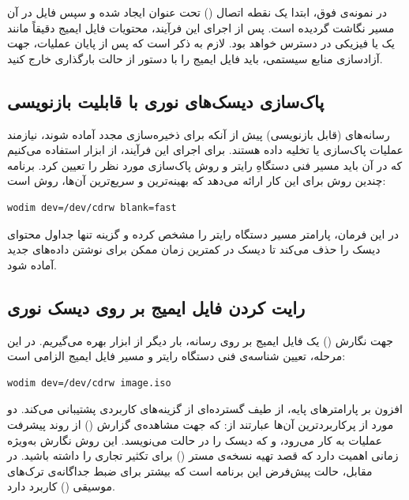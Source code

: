 در نمونه‌ی فوق، ابتدا یک نقطه اتصال () تحت عنوان  ایجاد شده و سپس فایل  در آن مسیر نگاشت گردیده است. پس از اجرای این فرآیند، محتویات فایل ایمیج دقیقاً مانند یک  یا  فیزیکی در دسترس خواهد بود. لازم به ذکر است که پس از پایان عملیات، جهت آزادسازی منابع سیستمی، باید فایل ایمیج را با دستور  از حالت بارگذاری خارج کنید.

\subsection{پاک‌سازی دیسک‌های نوری با قابلیت بازنویسی}

رسانه‌های  (قابل بازنویسی) پیش از آنکه برای ذخیره‌سازی مجدد آماده شوند، نیازمند عملیات پاک‌سازی یا تخلیه داده هستند. برای اجرای این فرآیند، از ابزار  استفاده می‌کنیم که در آن باید مسیر فنی دستگاهِ رایتر و روش پاک‌سازی مورد نظر را تعیین کرد. برنامه  چندین روش برای این کار ارائه می‌دهد که بهینه‌ترین و سریع‌ترین آن‌ها، روش  است:

\begin{latin}
\begin{lstlisting}
wodim dev=/dev/cdrw blank=fast
\end{lstlisting}
\end{latin}

در این فرمان، پارامتر  مسیر دستگاه رایتر را مشخص کرده و گزینه  تنها جداول محتوای دیسک را حذف می‌کند تا دیسک در کمترین زمان ممکن برای نوشتن داده‌های جدید آماده شود.

\subsection{رایت کردن فایل ایمیج بر روی دیسک نوری}

جهت نگارش () یک فایل ایمیج بر روی رسانه، بار دیگر از ابزار  بهره می‌گیریم. در این مرحله، تعیین شناسه‌ی فنی دستگاه رایتر و مسیر فایل ایمیج  الزامی است:

\begin{latin}
\begin{lstlisting}
wodim dev=/dev/cdrw image.iso
\end{lstlisting}
\end{latin}

افزون بر پارامترهای پایه،  از طیف گسترده‌ای از گزینه‌های کاربردی پشتیبانی می‌کند. دو مورد از پرکاربردترین آن‌ها عبارتند از:  که جهت مشاهده‌ی گزارش‌ () از روند پیشرفت عملیات به کار می‌رود، و  که دیسک را در حالت  می‌نویسد. این روش نگارش به‌ویژه زمانی اهمیت دارد که قصد تهیه نسخه‌ی مستر () برای تکثیر تجاری را داشته باشید. در مقابل، حالت پیش‌فرض این برنامه  است که بیشتر برای ضبط جداگانه‌ی ترک‌های موسیقی () کاربرد دارد.

